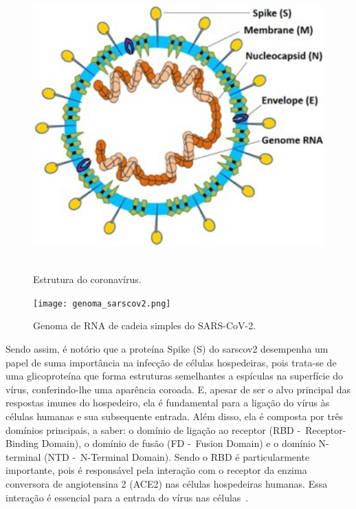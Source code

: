 \begin{figure}[htb]
  \centering
  \caption{Estrutura do coronavírus.}
  \includegraphics[scale=0.8]{figuras/estruturaSarsCov2.pdf}
  ~\label{fig:estruturaCoronavirus}
\end{figure}

\begin{figure}[htb]
  \centering
  \caption{Genoma de RNA de cadeia simples do SARS-CoV-2.}
  \texttt{[image: genoma\_sarscov2.png]}
  ~\label{fig:genomaCoronavirus}
\end{figure}

Sendo assim, é notório que a proteína Spike (S) do \gls{sarscov2} desempenha um papel de suma importância na infecção de células hospedeiras, pois trata-se de uma glicoproteína que forma estruturas semelhantes a espículas na superfície do vírus, conferindo-lhe uma aparência coroada. E, apesar de ser o alvo principal das respostas imunes do hospedeiro, ela é fundamental para a ligação do vírus às células humanas e sua subsequente entrada. Além disso, ela é composta por três domínios principais, a saber: o domínio de ligação ao receptor (RBD -~Receptor-Binding Domain), o domínio de fusão (FD -~Fusion Domain) e o domínio N-terminal (NTD -~N-Terminal Domain). Sendo o RBD é particularmente importante, pois é responsável pela interação com o receptor da enzima conversora de angiotensina 2 (ACE2) nas células hospedeiras humanas. Essa interação é essencial para a entrada do vírus nas células~\cite{covid19_cascella_2020}.

